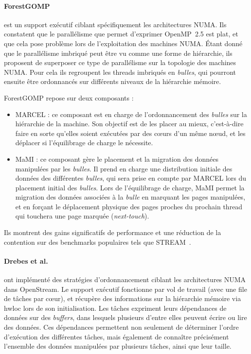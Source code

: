 \paragraph{ForestGOMP~\cite{Broquedis2010a}} est un support exécutif ciblant spécifiquement les architectures NUMA.
Ils constatent que le parallélisme que permet d'exprimer OpenMP~2.5 est plat, et que cela pose problème lors de l'exploitation des machines NUMA.
Étant donné que le parallélisme imbriqué peut être vu comme une forme de hiérarchie, ils proposent de superposer ce type de parallélisme sur la topologie des machines NUMA.
Pour cela ils regroupent les threads imbriqués en \emph{bulles}, qui pourront ensuite être ordonnancés sur différents niveaux de la hiérarchie mémoire.


ForestGOMP repose sur deux composants :
\begin{itemize}
  \item MARCEL : ce composant est en charge de l'ordonnancement des \emph{bulles} sur la hiérarchie de la machine. Son objectif est de les placer au mieux, c'est-à-dire faire en sorte qu'elles soient exécutées par des cœurs d'un même nœud, et les déplacer si l'équilibrage de charge le nécessite.
  \item MaMI : ce composant gère le placement et la migration des données manipulées par les \emph{bulles}.
Il prend en charge une distribution initiale des données des différentes \emph{bulles}, qui sera prise en compte par MARCEL lors du placement initial des \emph{bulles}.
Lors de l'équilibrage de charge, MaMI permet la migration des données associées à la \emph{bulle} en marquant les pages manipulées, et en forçant le déplacement physique des pages proches du prochain thread qui touchera une page marquée (\emph{next-touch}).
\end{itemize}

Ils montrent des gains significatifs de performance et une réduction de la contention sur des benchmarks populaires tels que STREAM~\cite{mccalpin1995}.

\paragraph{Drebes et al.~\cite{Drebes2014}} ont implémenté des stratégies d'ordonnancement ciblant les architectures NUMA dans OpenStream.
Le support exécutif fonctionne par vol de travail (avec une file de tâches par cœur), et récupère des informations sur la hiérarchie mémoire via hwloc lors de son initialisation.
Les tâches expriment leurs dépendances de données sur des \emph{buffers}, dans lesquels plusieurs d'entre elles peuvent écrire ou lire des données.
Ces dépendances permettent non seulement de déterminer l'ordre d'exécution des différentes tâches, mais également de connaître précisément l'ensemble des données manipulées par plusieurs tâches, ainsi que leur taille.

